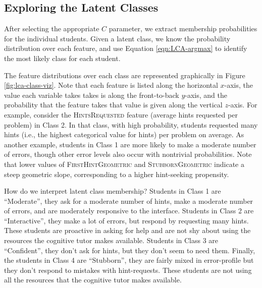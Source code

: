 \documentclass{edm_template}
\newcommand{\ftr}[1]{\textsc{#1}}
\begin{document}
\subsection{Exploring the Latent Classes}

After selecting the appropriate $C$ parameter, we extract membership probabilities for the individual students. Given a latent class, we know the probability distribution over each feature, and use Equation \ref{eqn:LCA-argmax} to identify the most likely class for each student.

The feature distributions over each class are represented graphically in Figure \ref{fig:lca-class-viz}. Note that each feature is listed along the horizontal $x$-axis, the value each variable takes takes is along the front-to-back $y$-axis, and the probability that the feature takes that value is given along the vertical $z$-axis. For example, consider the \ftr{HintsRequested} feature (average hints requested per problem) in Class 2. In that class, with high probability, students requested many hints (i.e., the highest categorical value for hints) per problem on average. As another example, students in Class 1 are more likely to make a moderate number of errors, though other error levels also occur with nontrivial probabilities. Note that lower values of \ftr{FirstHintGeometric} and \ftr{StubbornGeometric} indicate a steep geometric slope, corresponding to a higher hint-seeking propensity.

How do we interpret latent class membership? Students in Class 1 are ``Moderate'', they ask for a moderate number of hints, make a moderate number of errors, and are moderately responsive to the interface. Students in Class 2 are ``Interactive'', they make a lot of errors, but respond by requesting many hints. These students are proactive in asking for help and are not shy about using the resources the cognitive tutor makes available. Students in Class 3 are ``Confident'', they don't ask for hints, but they don't seem to need them. Finally, the students in Class 4 are ``Stubborn'', they are fairly mixed in error-profile but they don't respond to mistakes with hint-requests. These students are not using all the resources that the cognitive tutor makes available.
\end{document}
